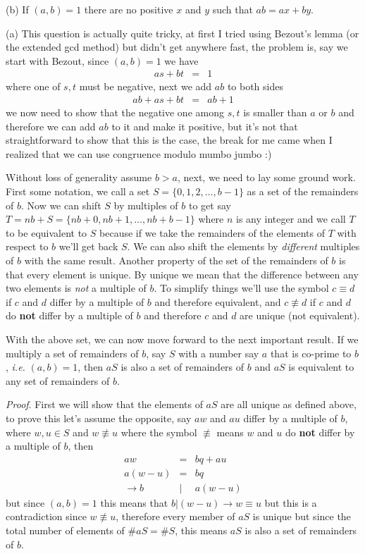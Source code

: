 \documentclass[aps,preprint,preprintnumbers,nofootinbib,showpacs,prd]{revtex4-1}
\newcommand{\ie}{{\it i.e.} }
\newcommand{\nbea}{\begin{eqnarray*}}
\newcommand{\neea}{\end{eqnarray*}}
\begin{document}
(b) If $(a,b)=1$ there are no positive $x$ and $y$ such that $ab = ax + by$.

(a) This question is actually quite tricky, at first I tried using Bezout's lemma (or the extended gcd method) but didn't get anywhere fast, the problem is, say we start with Bezout, since $(a,b)=1$ we have
%
\nbea
as + bt & = & 1
\neea
%
where one of $s,t$ must be negative, next we add $ab$ to both sides
%
\nbea
ab + as + bt & = & ab + 1
\neea
%
we now need to show that the negative one among $s,t$ is smaller than $a$ or $b$ and therefore we can add $ab$ to it and make it positive, but it's not that straightforward to show that this is the case, the break for me came when I realized that we can use congruence modulo mumbo jumbo :)

Without loss of generality assume $b > a$, next, we need to lay some ground work. First some notation, we call a set $S = \{0,1,2,\ldots,b-1\}$ as a set of the remainders of $b$. Now we can shift $S$ by multiples of $b$ to get say $T = nb + S = \{nb + 0, nb + 1, \ldots, nb + b-1\}$ where $n$ is any integer and we call $T$ to be equivalent to $S$ because if we take the remainders of the elements of $T$ with respect to $b$ we'll get back $S$. We can also shift the elements by {\it different} multiples of $b$ with the same result. Another property of the set of the remainders of $b$ is that every element is unique. By unique we mean that the difference between any two elements is {\it not} a multiple of $b$. To simplify things we'll use the symbol $c \equiv d$ if $c$ and $d$ differ by a multiple of $b$ and therefore equivalent, and $c \not \equiv d$ if $c$ and $d$ do {\bf not} differ by a multiple of $b$ and therefore $c$ and $d$ are unique (not equivalent).

With the above set, we can now move forward to the next important result. If  we multiply a set of remainders of $b$, say $S$ with a number say $a$ that is co-prime to $b$, \ie $(a,b)=1$, then $aS$ is also a set of remainders of $b$ and $aS$ is equivalent to any set of remainders of $b$.

{\it Proof}. First we will show that the elements of $aS$ are all unique as defined above, to prove this let's assume the opposite, say $aw$ and $au$ differ by a multiple of $b$, where $w,u \in S$ and $w \not\equiv u$ where the symbol $\not\equiv$ means $w$ and $u$ do {\bf not} differ by a multiple of $b$, then
%
\nbea
aw & = & bq + au \\
a(w-u) & = & bq \\
\to b &|& a(w-u)
\neea
%
but since $(a,b)=1$ this means that $b|(w-u) \to w \equiv u$ but this is a contradiction since $w \not\equiv u$, therefore every member of $aS$ is unique but since the total number of elements of $\#aS = \#S$, this means $aS$ is also a set of remainders of $b$.
\end{document}
